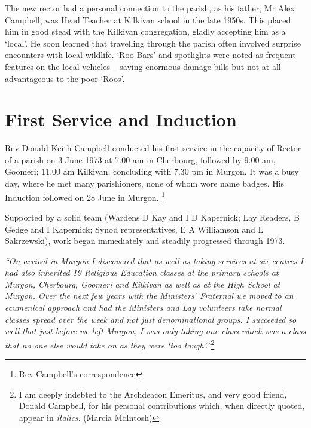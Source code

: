 The new rector had a personal connection to the parish, as his father, Mr Alex Campbell, was Head Teacher at Kilkivan school in the late 1950s. This placed him in good stead with the Kilkivan congregation, gladly accepting him as a `local'. He soon learned that travelling through the parish often involved surprise encounters with local wildlife. `Roo Bars' and spotlights were noted as frequent features on the local vehicles -- saving enormous damage bills but not at all advantageous to the poor `Roos'.



\section{First Service and Induction}



Rev Donald Keith Campbell conducted his first service in the capacity of Rector of a parish on 3 June 1973 at 7.00 am in Cherbourg, followed by 9.00 am, Goomeri; 11.00 am Kilkivan, concluding with 7.30 pm in Murgon. It was a busy day, where he met many parishioners, none of whom wore name badges. His Induction followed on 28 June in Murgon. \footnote{Rev Campbell's correspondence}


Supported by a solid team (Wardens D Kay and I D Kapernick; Lay Readers, B Gedge and I Kapernick; Synod representatives, E A Williamson and L Sakrzewski), work began immediately and steadily progressed through 1973.



\emph{``On arrival in Murgon I discovered that as well as taking services at six centres I had also inherited 19 Religious Education classes at the primary schools at Murgon, Cherbourg, Goomeri and Kilkivan as well as at the High School at Murgon. Over the next few years with the Ministers' Fraternal we moved to an ecumenical approach and had the Ministers and Lay volunteers take normal classes spread over the week and not just denominational groups. I succeeded so well that just before we left Murgon, I was only taking one class which was a class that no one else would take on as they were `too tough'.''}\footnote{I am deeply indebted to the Archdeacon Emeritus, and very good friend, Donald Campbell, for his personal contributions which, when directly quoted, appear in \emph{italics}. (Marcia McIntosh)}


